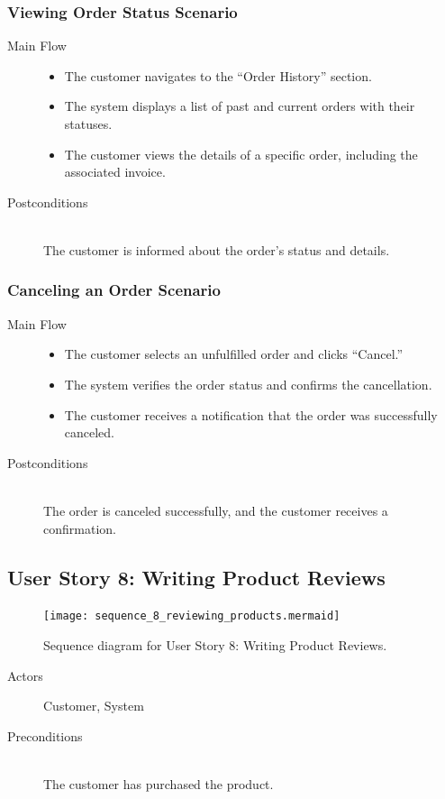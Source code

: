 \documentclass[twoside,a4paper,journal]{IEEEtran}
\begin{document}
\subsubsection{Viewing Order Status Scenario}
\begin{description}
  \item[Main Flow] \hfill
    \begin{itemize}
      \item The customer navigates to the ``Order History'' section.
      \item The system displays a list of past and current orders with their
        statuses.
      \item The customer views the details of a specific order, including the
        associated invoice.
    \end{itemize}
  \item[Postconditions] \hfill \\
    The customer is informed about the order's status and details.
\end{description}
\subsubsection{Canceling an Order Scenario}
\begin{description}
  \item[Main Flow] \hfill
    \begin{itemize}
      \item The customer selects an unfulfilled order and clicks ``Cancel.''
      \item The system verifies the order status and confirms the cancellation.
      \item The customer receives a notification that the order was successfully
        canceled.
    \end{itemize}
  \item[Postconditions] \hfill \\
    The order is canceled successfully, and the customer receives a
    confirmation.
\end{description}

\subsection{User Story 8: Writing Product Reviews}
\begin{figure}[!t]
\centering
\texttt{[image: sequence\_8\_reviewing\_products.mermaid]}
\caption{Sequence diagram for User Story 8: Writing Product Reviews.}
\label{fig:sequence_8}
\end{figure}
\begin{description}
  \item[Actors] Customer, System
  \item[Preconditions] \hfill \\ The customer has purchased the product.
\end{description}
\end{document}
